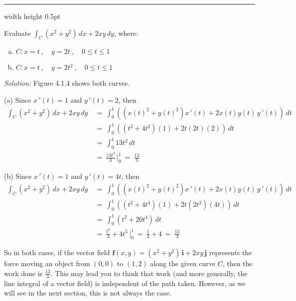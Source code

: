 \medskip
\hrule width \textwidth height 0.5pt
\begin{exmp}\label{exmp:lineintexmp}
 Evaluate $\int_C (x^2 + y^2 )\,dx + 2xy\,dy$, where:
 \begin{enumerate}[(a)]
  \item $C: x=t~,\quad y=2t~,\quad 0 \le t \le 1$
  \item $C: x=t~,\quad y=2t^2 ~,\quad 0 \le t \le 1$
 \end{enumerate}

 \piccaption[]{}
 \par\noindent \emph{Solution:} Figure 4.1.4 shows both curves.\smallskip
 \par\noindent (a) Since $x\,'(t)=1$ and $y\,'(t)=2$, then
 \begin{align*}
  \int_C (x^2 + y^2 )\,dx + 2xy\,dy ~&=~
   \int_0^1 \left( ( x(t)^2 + y(t)^2 )x\,'(t) + 2x(t)y(t)\,y\,'(t) \right) \,dt\\
   &=~ \int_0^1 \left( (t^2 + 4t^2 )(1) + 2t(2t)(2) \right) \,dt\\
   &=~ \int_0^1 13t^2 \,dt\\
   &=~ \frac{13t^3}{3}\,\Bigg|_0^1 ~=~ \frac{13}{3}
 \end{align*}

 \par\noindent (b) Since $x\,'(t)=1$ and $y\,'(t)=4t$, then
 \begin{align*}
  \int_C (x^2 + y^2 )\,dx + 2xy\,dy ~&=~
   \int_0^1 \left( ( x(t)^2 + y(t)^2 )x\,'(t) + 2x(t)y(t)\,y\,'(t) \right) \,dt\\
   &=~ \int_0^1 \left( (t^2 + 4t^4 )(1) + 2t(2t^2 )(4t) \right) \,dt\\
   &=~ \int_0^1 (t^2 + 20t^4 )\,dt\\
   &=~ \frac{t^3}{3} + 4t^5 \,\Bigg|_0^1 ~=~ \frac{1}{3} + 4 ~=~ \frac{13}{3}
 \end{align*}

 So in both cases, if the vector field $\mathbf{f}(x,y) = ( x^2 + y^2 )\,\mathbf{i} +
 2xy\,\mathbf{j}$ represents the force moving an object from $(0,0)$ to $(1,2)$ along the given curve $C$, then the
 work done is $\frac{13}{3}$. This may lead you to think that work (and more generally, the line integral of a vector
 field) is independent of the path taken. However, as we will see in the next section, this is not always the
 case.
\end{exmp}
